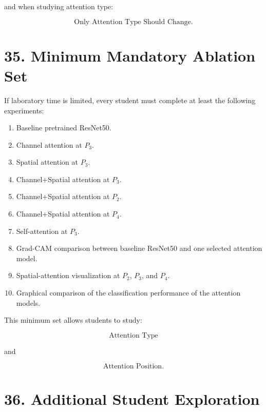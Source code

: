 \documentclass[10pt]{article}
\begin{document}
and when studying attention type:

\[
\boxed{
\text{Only Attention Type Should Change}.
}
\]

\section*{35. Minimum Mandatory Ablation Set}

If laboratory time is limited, every student must complete at least the
following experiments:

\begin{enumerate}

\item Baseline pretrained ResNet50.

\item Channel attention at $P_3$.

\item Spatial attention at $P_3$.

\item Channel+Spatial attention at $P_3$.

\item Channel+Spatial attention at $P_2$.

\item Channel+Spatial attention at $P_4$.

\item Self-attention at $P_3$.

\item Grad-CAM comparison between baseline ResNet50 and one selected
attention model.

\item Spatial-attention visualization at $P_2$, $P_3$, and $P_4$.

\item Graphical comparison of the classification performance of the attention
models.

\end{enumerate}

This minimum set allows students to study:

\[
\boxed{\text{Attention Type}}
\]

and

\[
\boxed{\text{Attention Position}}.
\]

\section*{36. Additional Student Exploration}
\end{document}
